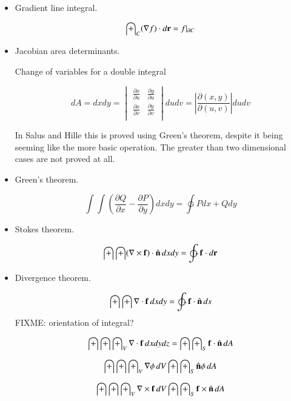 \documentclass{article}
\newcommand{\grad}[0]{\nabla}
\newcommand{\PD}[2]{\frac{\partial {#2}}{\partial {#1}}}
\newcommand{\Abs}[1]{\left\lvert{#1}\right\rvert}
\begin{document}
\begin{itemize}

\item Gradient line integral. 

\begin{equation}\label{eqn:lineintegral}
\int_C (\grad f) \cdot d\Br = f \vert_{\partial C}
\end{equation}

\item Jacobian area determinants. 

Change of variables for a double integral

\begin{equation}
dA = dx dy =
\begin{vmatrix}
\PD{u}{x} & \PD{u}{y} \\
\PD{v}{x} & \PD{v}{y} \\
\end{vmatrix}
du dv
= \Abs{ \PD{(u,v)}{(x,y)} } du dv
\end{equation}

In Salus and Hille this is proved using Green's theorem, despite it 
being seeming like the more basic operation.  The greater than two
dimensional cases are not proved at all.

\item Green's theorem. 

\begin{equation}\label{eqn:greens}
\int\int \left(\PD{x}{Q} - \PD{y}{P}\right) dx dy = \ointctrclockwise P dx + Q dy
\end{equation}

\item Stokes theorem. 

\begin{equation}\label{eqn:stokes}
\int\int (\grad \cross \Bf) \cdot \ncap\, dx dy = \ointctrclockwise \Bf \cdot d\Br
\end{equation}

\item Divergence theorem. 

\begin{equation}\label{eqn:divergenceplane}
\int\int \grad \cdot \Bf\, dx dy = \oint \Bf \cdot \ncap\, ds
\end{equation}
FIXME: orientation of integral?

\begin{equation}\label{eqn:divergencevolume}
\int\int\int_V \grad \cdot \Bf\, dx dy dz = \int\int_S \Bf \cdot \ncap\, dA
\end{equation}

\begin{equation}\label{eqn:divergencegrad}
\int\int\int_V \grad \phi\, dV \int\int_S \ncap \phi\, dA
\end{equation}

\begin{equation}\label{eqn:divergencegradcross}
\int\int\int_V \grad \cross \Bf\, dV \int\int_S \Bf \cross \ncap\, dA
\end{equation}


\end{itemize}
\end{document}
